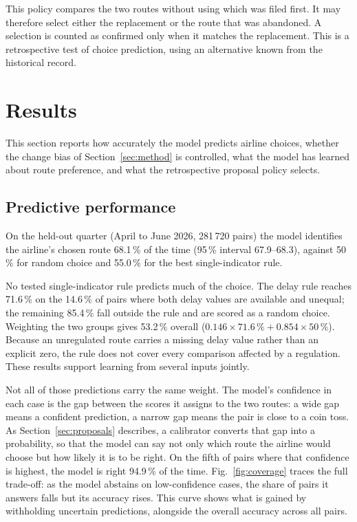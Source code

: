 \documentclass[a4paper,conference]{IEEEtran}
\begin{document}
This policy compares the two routes without using which was filed first.
It may therefore select either the replacement or the route that was
abandoned. A selection is counted as confirmed only when it matches the
replacement. This is a retrospective test of choice prediction, using an
alternative known from the historical record.

\section{Results}
\label{sec:results}

This section reports how accurately the model predicts airline choices,
whether the change bias of Section~\ref{sec:method} is controlled, what
the model has learned about route preference, and what the retrospective proposal policy selects.

\subsection{Predictive performance}

On the held-out quarter (April to June 2026, 281\,720 pairs) the model
identifies the airline's chosen route 68.1\,\% of the time (95\,\%
interval 67.9--68.3), against 50\,\% for random choice and 55.0\,\% for
the best single-indicator rule.

No tested single-indicator rule predicts much of the choice. The delay
rule reaches 71.6\,\% on the 14.6\,\% of pairs where both delay values
are available and unequal; the remaining 85.4\,\% fall outside the rule
and are scored as a random choice. Weighting the two groups gives
53.2\,\% overall ($0.146 \times 71.6\,\% + 0.854 \times 50\,\%$).
Because an unregulated route carries a missing delay value rather than an
explicit zero, the rule does not cover every comparison affected by a
regulation. These results support learning from several inputs jointly.

Not all of those predictions carry the same weight. The model's
confidence in each case is the gap between the scores it assigns to the
two routes: a wide gap means a confident prediction, a narrow gap means
the pair is close to a coin toss. As Section~\ref{sec:proposals}
describes, a calibrator converts that gap into a probability, so that
the model can say not only which route the airline would choose but how
likely it is to be right. On the fifth of
pairs where that confidence is highest, the model is right 94.9\,\% of
the time. Fig.~\ref{fig:coverage} traces the full trade-off: as the
model abstains on low-confidence cases, the share of pairs it answers falls but its accuracy rises. This curve
shows what is gained by withholding uncertain predictions, alongside
the overall accuracy across all pairs.
\end{document}
